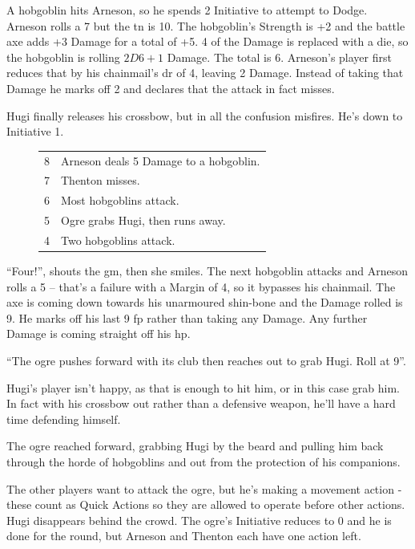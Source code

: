\documentclass[titlepage,a4paper,openany]{book}
\begin{document}
\begin{multicols}{2}
{\begin{exampletext}
	A hobgoblin hits Arneson, so he spends 2 Initiative to attempt to Dodge. Arneson rolls a 7 but the \gls{tn} is 10.
The hobgoblin's Strength is +2 and the battle axe adds +3 Damage for a total of +5.
4 of the Damage is replaced with a die, so the hobgoblin is rolling $2D6+1$ Damage.
The total is 6.
Arneson's player first reduces that by his chainmail's \gls{dr} of 4, leaving 2 Damage.
Instead of taking that Damage he marks off 2  and declares that the attack in fact misses.

		Hugi finally releases his crossbow, but in all the confusion misfires. He's down to Initiative 1.

		\needspace{3cm}
		\begin{figure}

			\begin{tabularx}{.3\textwidth}{c|X}
				\setcounter{enc}{12}

				8 & Arneson deals 5 Damage to a hobgoblin. \\

				7 & Thenton misses. \\

				6 & Most hobgoblins attack. \\

				5 & Ogre grabs Hugi, then runs away. \\
				4 & Two hobgoblins attack. \\


			\end{tabularx}

		\end{figure}

	``Four!'', shouts the \gls{gm}, then she smiles. The next hobgoblin attacks and Arneson rolls a 5 -- that's a failure with a Margin of 4, so it bypasses his chainmail. The axe is coming down towards his unarmoured shin-bone and the Damage rolled is 9. He marks off his last 9 \gls{fp} rather than taking any Damage. Any further Damage is coming straight off his \gls{hp}.

		``The ogre pushes forward with its club then reaches out to grab Hugi. Roll at  9''.

		Hugi's player isn't happy, as that is enough to hit him, or in this case grab him. In fact with his crossbow out rather than a defensive weapon, he'll have a hard time defending himself.

		The ogre reached forward, grabbing Hugi by the beard and pulling him back through the horde of hobgoblins and out from the protection of his companions.

		The other players want to attack the ogre, but he's making a movement action - these count as Quick Actions so they are allowed to operate before other actions. Hugi disappears behind the crowd. The ogre's Initiative reduces to 0 and he is done for the \gls{round}, but Arneson and Thenton each have one action left.
	\end{exampletext}

}{}

\end{multicols}
\end{document}
